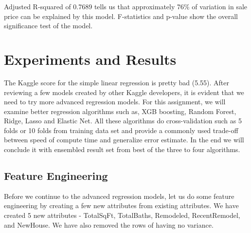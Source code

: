 \documentclass[sigconf]{acmart}
\begin{document}
	Adjusted R-squared of 0.7689 tells us that approximately 76\% of variation in sale price can be explained by this model. F-statistics and p-value show the overall significance test of the model.
	\section{Experiments and Results}
	
	
	The Kaggle score for the simple linear regression is pretty bad (5.55). After reviewing a few models created by other Kaggle developers, it is evident that we need to try more advanced regression models.
	For this assignment, we will examine better regression algorithms such as, XGB boosting, Random Forest, Ridge, Lasso and Elastic Net. All these algorithms do cross-validation such as 5 folds or 10 folds from training data set and provide a commonly used trade-off between speed of compute time and generalize error estimate. In the end we will conclude it with ensembled result set from best of the three to four algorithms.
	
	\subsection{Feature Engineering}

	Before we continue to the advanced regression models, let us do some feature engineering by creating a few new attributes from existing attributes. We have created 5 new attributes - TotalSqFt, TotalBaths, Remodeled, RecentRemodel, and NewHouse. We have also removed the rows of having no variance.
	
\end{document}
